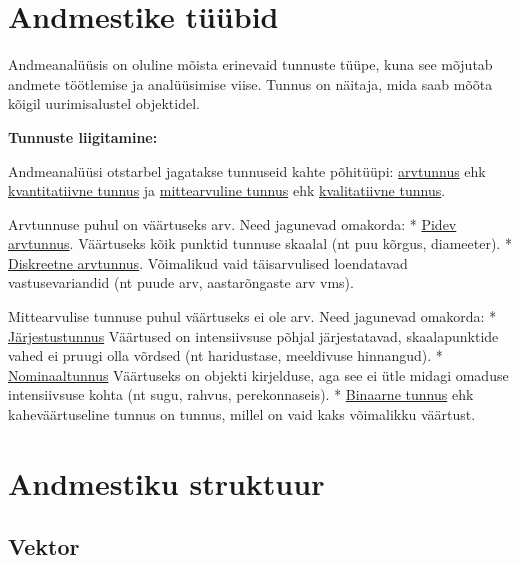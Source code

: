 \documentclass[
]{book}
\begin{document}
\section{Andmestike tüübid}\label{andmestike-tuxfcuxfcbid}

Andmeanalüüsis on oluline mõista erinevaid tunnuste tüüpe, kuna see mõjutab andmete töötlemise ja analüüsimise viise. Tunnus on näitaja, mida saab mõõta kõigil uurimisalustel objektidel.

\textbf{Tunnuste liigitamine:}

Andmeanalüüsi otstarbel jagatakse tunnuseid kahte põhitüüpi: \href{https://sonaveeb.ee/search/unif/dlall/aso/arvtunnus/1/est}{arvtunnus} ehk \href{https://sonaveeb.ee/search/unif/dlall/aso/kvantitatiivne\%20tunnus/1/est}{kvantitatiivne tunnus} ja \href{https://sonaveeb.ee/search/unif/dlall/aso/mittearvuline\%20tunnus/1/est}{mittearvuline tunnus} ehk \href{https://sonaveeb.ee/search/unif/dlall/aso/kvalitatiivne\%20tunnus/1/est}{kvalitatiivne tunnus}.

Arvtunnuse puhul on väärtuseks arv. Need jagunevad omakorda:
* \href{https://sonaveeb.ee/search/unif/dlall/aso/pidev\%20arvtunnus/1/est}{Pidev arvtunnus}. Väärtuseks kõik punktid tunnuse skaalal (nt puu kõrgus, diameeter).
* \href{https://sonaveeb.ee/search/unif/dlall/aso/diskreetne\%20arvtunnus/1/est}{Diskreetne arvtunnus}. Võimalikud vaid täisarvulised loendatavad vastusevariandid (nt puude arv, aastarõngaste arv vms).

Mittearvulise tunnuse puhul väärtuseks ei ole arv. Need jagunevad omakorda:
* \href{https://sonaveeb.ee/search/unif/dlall/aso/järjestustunnus/1/est}{Järjestustunnus} Väärtused on intensiivsuse põhjal järjestatavad, skaalapunktide vahed ei pruugi olla võrdsed (nt haridustase, meeldivuse hinnangud).
* \href{https://sonaveeb.ee/search/unif/dlall/aso/nominaaltunnus/1/est}{Nominaaltunnus} Väärtuseks on objekti kirjelduse, aga see ei ütle midagi omaduse intensiivsuse kohta (nt sugu, rahvus, perekonnaseis).
* \href{https://sonaveeb.ee/search/unif/dlall/aso/binaarne\%20tunnus/1/est}{Binaarne tunnus} ehk kaheväärtuseline tunnus on tunnus, millel on vaid kaks võimalikku väärtust.

\section{Andmestiku struktuur}\label{andmestiku-struktuur}

\subsection{Vektor}\label{vektor}
\end{document}
